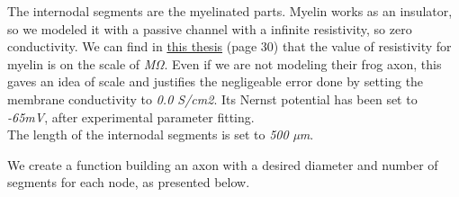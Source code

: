 \documentclass[]{article}
\begin{document}
The internodal segments are the myelinated parts. Myelin works as an
insulator, so we modeled it with a passive channel with a infinite
resistivity, so zero conductivity. We can find in
\href{https://pdfs.semanticscholar.org/a622/57ca2a4024a2165cad8384df388f16208f31.pdf}{this
thesis} (page 30) that the value of resistivity for myelin is on the
scale of \emph{MΩ}. Even if we are not modeling their frog axon, this
gaves an idea of scale and justifies the negligeable error done by
setting the membrane conductivity to \emph{0.0 S/cm2}. Its Nernst
potential has been set to \emph{-65mV}, after experimental parameter
fitting.\\
The length of the internodal segments is set to \emph{500 µm}.

We create a function building an axon with a desired diameter and number
of segments for each node, as presented below.
\end{document}
